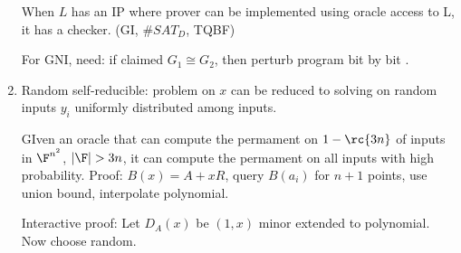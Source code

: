 \begin{enumerate}
When $L$ has an IP where prover can be implemented using oracle access to L, it has a checker. (GI, $\#SAT_D$, TQBF)

For GNI, need: if claimed $G_1\cong G_2$, then perturb program bit by bit .
\item
Random self-reducible: problem on $x$ can be reduced to solving on random inputs $y_i$ uniformly distributed among inputs.

GIven an oracle that can compute the permament on $1-\rc{3n}$ of inputs in $\F^{n^2}$, $|\F|>3n$, it can compute the permament on all inputs with high probability. Proof: $B(x)=A+xR$, query $B(a_i)$ for $n+1$ points, use union bound, interpolate polynomial.

Interactive proof: Let $D_A(x)$ be $(1,x)$ minor extended to polynomial. Now choose random.
\end{enumerate}

